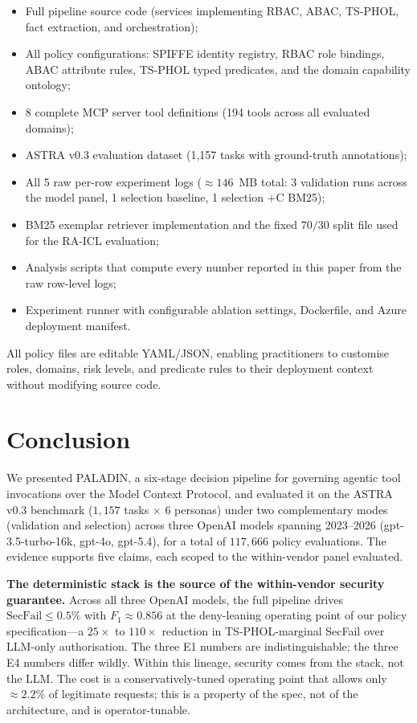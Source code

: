 \documentclass[10pt,a4paper,twocolumn]{article}
\begin{document}
\begin{itemize}
  \item Full pipeline source code (services implementing RBAC, ABAC, TS-PHOL, fact extraction, and orchestration);
  \item All policy configurations: SPIFFE identity registry, RBAC role bindings, ABAC attribute rules, TS-PHOL typed predicates, and the domain capability ontology;
  \item 8 complete MCP server tool definitions (194 tools across all evaluated domains);
  \item ASTRA v0.3 evaluation dataset (1{,}157 tasks with ground-truth annotations);
  \item All 5 raw per-row experiment logs ($\approx 146$~MB total: 3 validation runs across the model panel, 1 selection baseline, 1 selection +C BM25);
  \item BM25 exemplar retriever implementation and the fixed $70/30$ split file used for the RA-ICL evaluation;
  \item Analysis scripts that compute every number reported in this paper from the raw row-level logs;
  \item Experiment runner with configurable ablation settings, Dockerfile, and Azure deployment manifest.
\end{itemize}

\noindent All policy files are editable YAML/JSON, enabling practitioners to customise roles, domains, risk levels, and predicate rules to their deployment context without modifying source code.

\section{Conclusion}
\label{sec:conclusion}

We presented PALADIN, a six-stage decision pipeline for governing agentic tool invocations over the Model Context Protocol, and evaluated it on the ASTRA v0.3 benchmark ($1{,}157$ tasks $\times$ $6$ personas) under two complementary modes (validation and selection) across three OpenAI models spanning 2023--2026 (gpt-3.5-turbo-16k, gpt-4o, gpt-5.4), for a total of $117{,}666$ policy evaluations. The evidence supports five claims, each scoped to the within-vendor panel evaluated.

\textbf{The deterministic stack is the source of the within-vendor security guarantee.} Across all three OpenAI models, the full pipeline drives $\mathrm{SecFail} \leq 0.5\%$ with $F_1 \approx 0.856$ at the deny-leaning operating point of our policy specification---a $25\times$ to $110\times$ reduction in TS-PHOL-marginal SecFail over LLM-only authorisation. The three E1 numbers are indistinguishable; the three E4 numbers differ wildly. Within this lineage, security comes from the stack, not the LLM. The cost is a conservatively-tuned operating point that allows only $\approx 2.2\%$ of legitimate requests; this is a property of the spec, not of the architecture, and is operator-tunable.
\end{document}
